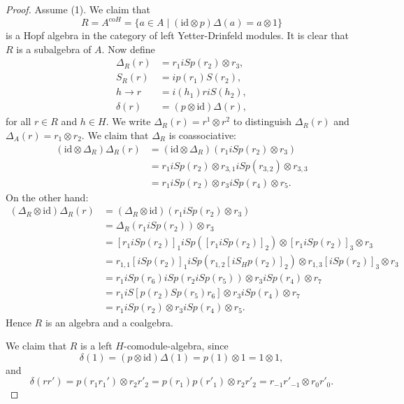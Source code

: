 \documentclass[12pt]{amsproc}
\begin{document}
\begin{proof}
Assume (1). We claim that 
\[
R=A^{\textrm{co}H}=\{a\in A\mid(\textrm{id}\otimes p)\Delta(a)=a\otimes1\}
\]
is a Hopf algebra in the category of left Yetter-Drinfeld modules.
It is clear that $R$ is a subalgebra of $A$. Now define
\begin{align*}
\Delta_{R}(r) & =r_{1}iSp(r_{2})\otimes r_{3},\\
S_{R}(r) & =ip(r_{1})S(r_{2}),\\
h\to r & =i(h_{1})riS(h_{2}),\\
\delta(r) & =(p\otimes\textrm{id})\Delta(r),
\end{align*}
for all $r\in R$ and $h\in H$. 
We write $\Delta_{R}(r)=r^{1}\otimes r^{2}$ to distinguish $\Delta_{R}(r)$
and $\Delta_{A}(r)=r_{1}\otimes r_{2}$. We claim that $\Delta_{R}$
is coassociative:
\begin{align*}
(\textrm{id}\otimes\Delta_{R})\Delta_{R}(r) & =(\textrm{id}\otimes\Delta_{R})(r_{1}iSp(r_{2})\otimes r_{3})\\
 & =r_{1}iSp(r_{2})\otimes r_{3,1}iSp(r_{3,2})\otimes r_{3,3}\\
 & =r_{1}iSp(r_{2})\otimes r_{3}iSp(r_{4})\otimes r_{5}.
 \end{align*}
On the other hand:
\begin{align*}
(\Delta_{R}\otimes\textrm{id})\Delta_{R}(r) & =(\Delta_{R}\otimes\textrm{id})(r_{1}iSp(r_{2})\otimes r_{3})\\
 & =\Delta_{R}(r_{1}iSp(r_{2}))\otimes r_{3}\\
 & =[r_{1}iSp(r_{2})]_{1}iSp([r_{1}iSp(r_{2})]_{2})\otimes[r_{1}iSp(r_{2})]_{3}\otimes r_{3}\\
 & =r_{1,1}[iSp(r_{2})]_{1}iSp(r_{1,2}[iS_{H}p(r_{2})]_{2})\otimes r_{1,3}[iSp(r_{2})]_{3}\otimes r_{3}\\
 & =r_{1}iSp(r_{6})iSp(r_{2}iSp(r_{5}))\otimes r_{3}iSp(r_{4})\otimes r_{7}\\
 & =r_{1}iS[p(r_{2})Sp(r_{5})r_{6}]\otimes r_{3}iSp(r_{4})\otimes r_{7}\\
 & =r_{1}iSp(r_{2})\otimes r_{3}iSp(r_{4})\otimes r_{5}.\end{align*}
Hence $R$ is an algebra and a coalgebra. 

We claim that $R$ is a left $H$-comodule-algebra, since \[
\delta(1)=(p\otimes\textrm{id})\Delta(1)=p(1)\otimes1=1\otimes1,\]
and \[
\delta(rr')=p(r_{1}r_{1}')\otimes r_{2}r'_{2}=p(r_{1})p(r'_{1})\otimes r_{2}r'_{2}=r_{-1}r'_{-1}\otimes r_{0}r'_{0}.\]


\end{proof}
\end{document}
